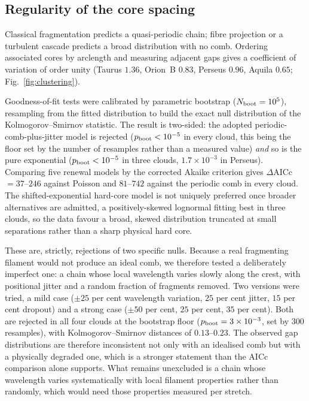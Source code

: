 \documentclass[usenatbib,twoside,twocolumn]{mnras}
\begin{document}
\subsection{Regularity of the core spacing}
\label{sec:clustering}

Classical fragmentation predicts a quasi-periodic chain; fibre projection or a turbulent cascade predicts a broad distribution with no comb. Ordering associated cores by arclength and measuring adjacent gaps gives a coefficient of variation of order unity (Taurus $1.36$, Orion~B $0.83$, Perseus $0.96$, Aquila $0.65$; Fig.~\ref{fig:clustering}).

Goodness-of-fit tests were calibrated by parametric bootstrap ($N_{\rm boot}=10^5$), resampling from the fitted distribution to build the exact null distribution of the Kolmogorov--Smirnov statistic. The result is two-sided: the adopted periodic-comb-plus-jitter model is rejected ($p_{\rm boot}<10^{-5}$ in every cloud, this being the floor set by the number of resamples rather than a measured value) \emph{and} so is the pure exponential ($p_{\rm boot}<10^{-5}$ in three clouds, $1.7\times10^{-3}$ in Perseus). Comparing five renewal models by the corrected Akaike criterion gives $\Delta$AICc$=37$--$246$ against Poisson and $81$--$742$ against the periodic comb in every cloud. The shifted-exponential hard-core model is not uniquely preferred once broader alternatives are admitted, a positively-skewed lognormal fitting best in three clouds, so the data favour a broad, skewed distribution truncated at small separations rather than a sharp physical hard core.

These are, strictly, rejections of two specific nulls. Because a real fragmenting filament would not produce an ideal comb, we therefore tested a deliberately imperfect one: a chain whose local wavelength varies slowly along the crest, with positional jitter and a random fraction of fragments removed. Two versions were tried, a mild case ($\pm25$ per cent wavelength variation, $25$ per cent jitter, $15$ per cent dropout) and a strong case ($\pm50$ per cent, $25$ per cent, $35$ per cent). Both are rejected in all four clouds at the bootstrap floor ($p_{\rm boot}=3\times10^{-3}$, set by $300$ resamples), with Kolmogorov--Smirnov distances of $0.13$--$0.23$. The observed gap distributions are therefore inconsistent not only with an idealised comb but with a physically degraded one, which is a stronger statement than the AICc comparison alone supports. What remains unexcluded is a chain whose wavelength varies systematically with local filament properties rather than randomly, which would need those properties measured per stretch.
\end{document}
